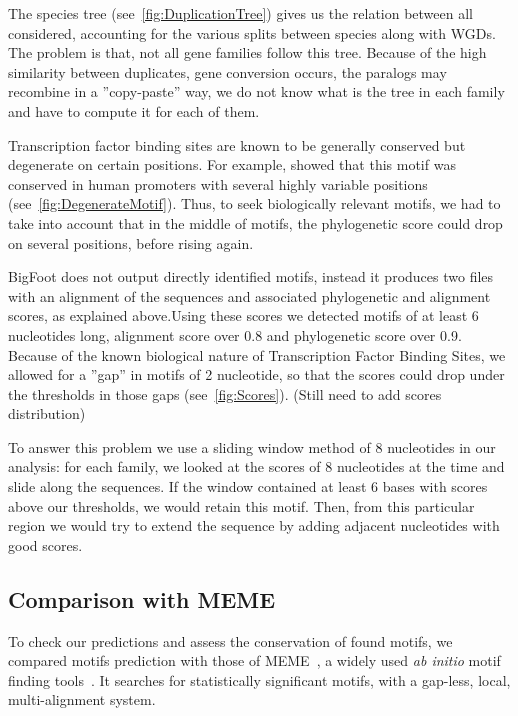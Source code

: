 The species tree (see~\autoref{fig:DuplicationTree}) gives us the relation between all considered, accounting for the various splits between species along with WGDs. The problem is that, not all gene families follow this tree. Because of the high similarity between duplicates, gene conversion occurs, the paralogs may recombine in a ''copy-paste'' way, we do not know what is the tree in each family and have to compute it for each of them.

Transcription factor binding sites are known to be generally conserved but degenerate on certain positions. For example, \citealt{whitfield_functional_2012} showed that this motif was conserved in human promoters with several highly variable positions (see~\autoref{fig:DegenerateMotif}). Thus, to seek biologically relevant motifs, we had to take into account that in the middle of motifs, the phylogenetic score could drop on several positions, before rising again.

BigFoot does not output directly identified motifs, instead it produces two files with an alignment of the sequences and associated phylogenetic and alignment scores, as explained above.Using these scores we detected motifs of at least 6 nucleotides long, alignment score over 0.8 and phylogenetic score over 0.9. Because of the known biological nature of Transcription Factor Binding Sites, we allowed for a ''gap'' in motifs of 2 nucleotide, so that the scores could drop under the thresholds in those gaps (see~\autoref{fig:Scores}). (Still need to add scores distribution)

To answer this problem we use a sliding window method of 8 nucleotides in our analysis: for each family, we looked at the scores of 8 nucleotides at the time and slide along the sequences. If the window contained at least 6 bases with scores above our thresholds, we would retain this motif. Then, from this particular region we would try to extend the sequence by adding adjacent nucleotides with good scores.

\subsection*{Comparison with MEME}

To check our predictions and assess the conservation of found motifs, we compared motifs prediction with those of MEME~\citep{bailey_meme:_2006}, a widely used \textit{ab initio} motif finding tools~\citep{dhaeseleer_how_2006}. It searches for statistically significant motifs, with a gap-less, local, multi-alignment system.

